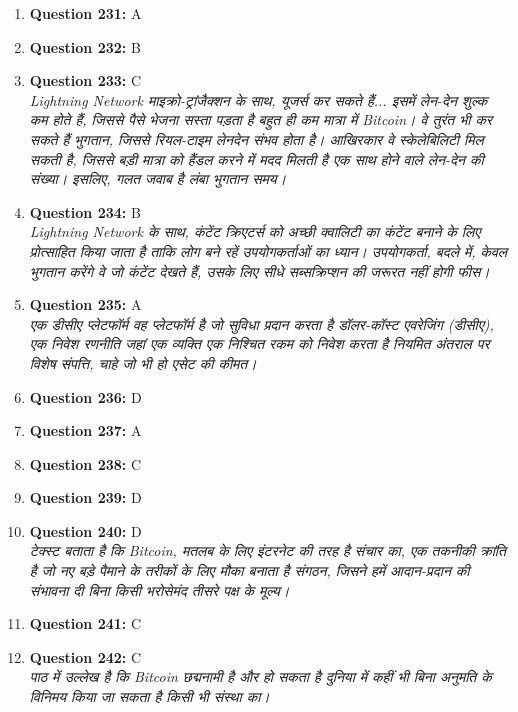 \documentclass[12pt,a4paper]{article}
\begin{document}
\begin{enumerate}
\item \textbf{Question 231:} A

\item \textbf{Question 232:} B

\item \textbf{Question 233:} C
\\ \textit{Lightning Network माइक्रो-ट्रांजैक्शन के साथ, यूजर्स कर सकते हैं... इसमें लेन-देन शुल्क कम होते हैं, जिससे पैसे भेजना सस्ता पड़ता है बहुत ही कम मात्रा में Bitcoin। वे तुरंत भी कर सकते हैं भुगतान, जिससे रियल-टाइम लेनदेन संभव होता है। आखिरकार वे स्केलेबिलिटी मिल सकती है, जिससे बड़ी मात्रा को हैंडल करने में मदद मिलती है एक साथ होने वाले लेन-देन की संख्या। इसलिए, गलत जवाब है लंबा भुगतान समय।}

\item \textbf{Question 234:} B
\\ \textit{Lightning Network के साथ, कंटेंट क्रिएटर्स को अच्छी क्वालिटी का कंटेंट बनाने के लिए प्रोत्साहित किया जाता है ताकि लोग बने रहें उपयोगकर्ताओं का ध्यान। उपयोगकर्ता, बदले में, केवल भुगतान करेंगे वे जो कंटेंट देखते हैं, उसके लिए सीधे सब्सक्रिप्शन की जरूरत नहीं होगी फीस।}

\item \textbf{Question 235:} A
\\ \textit{एक डीसीए प्लेटफॉर्म वह प्लेटफॉर्म है जो सुविधा प्रदान करता है डॉलर-कॉस्ट एवरेजिंग (डीसीए), एक निवेश रणनीति जहां एक व्यक्ति एक निश्चित रकम को निवेश करता है नियमित अंतराल पर विशेष संपत्ति, चाहे जो भी हो एसेट की कीमत।}

\item \textbf{Question 236:} D

\item \textbf{Question 237:} A

\item \textbf{Question 238:} C

\item \textbf{Question 239:} D

\item \textbf{Question 240:} D
\\ \textit{टेक्स्ट बताता है कि Bitcoin, मतलब के लिए इंटरनेट की तरह है संचार का, एक तकनीकी क्रांति है जो नए बड़े पैमाने के तरीकों के लिए मौका बनाता है संगठन, जिसने हमें आदान-प्रदान की संभावना दी बिना किसी भरोसेमंद तीसरे पक्ष के मूल्य।}

\item \textbf{Question 241:} C

\item \textbf{Question 242:} C
\\ \textit{पाठ में उल्लेख है कि Bitcoin छद्मनामी है और हो सकता है दुनिया में कहीं भी बिना अनुमति के विनिमय किया जा सकता है किसी भी संस्था का।}


\end{enumerate}
\end{document}
